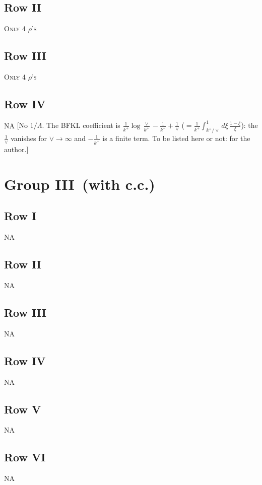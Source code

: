 \documentclass[9pt]{article}
\numberwithin{equation}{section}
\begin{document}
\subsection{Row II}
\textsc{Only 4 $\rho$'s}
\subsection{Row III}
\textsc{Only 4 $\rho$'s}
\subsection{Row IV}
\textsc{NA} {\color{red}[No $1/\Lambda$. The BFKL coefficient is $\frac{1}{k^{+}}\log\frac{\vee}{k^{+}}-\frac{1}{k^{+}}+\frac{1}{\vee}$ ($=\frac{1}{k^{+}}\int_{k^{+}/\vee}^{1}d\xi\,\frac{1-\xi}{\xi}$): the $\frac{1}{\vee}$ vanishes for $\vee\to\infty$ and $-\frac{1}{k^{+}}$ is a finite term. To be listed here or not: for the author.]}
\section{Group III\, (with c.c.)}
\subsection{Row I}
\textsc{NA}
\subsection{Row II}
\textsc{NA}
 \subsection{Row III}
 \textsc{NA}
\subsection{Row IV}
\textsc{NA}
\subsection{Row V}
\textsc{NA}
\subsection{Row VI}
\textsc{NA}
\end{document}
